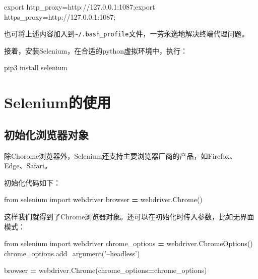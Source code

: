 \documentclass[]{ctexbook}
\newenvironment{Shaded}{\begin{snugshade}}{\end{snugshade}}
\newcommand{\BuiltInTok}[1]{#1}
\newcommand{\ExtensionTok}[1]{#1}
\newcommand{\ImportTok}[1]{#1}
\newcommand{\NormalTok}[1]{#1}
\newcommand{\OperatorTok}[1]{\textcolor[rgb]{0.81,0.36,0.00}{\textbf{#1}}}
\newcommand{\StringTok}[1]{\textcolor[rgb]{0.31,0.60,0.02}{#1}}
\newcommand{\VariableTok}[1]{\textcolor[rgb]{0.00,0.00,0.00}{#1}}
\begin{document}
\begin{Shaded}
\begin{Highlighting}[]
\BuiltInTok{export} \VariableTok{http_proxy=}\NormalTok{http://127.0.0.1:1087;}\BuiltInTok{export} \VariableTok{https_proxy=}\NormalTok{http://127.0.0.1:1087;}
\end{Highlighting}
\end{Shaded}

也可将上述内容加入到\texttt{\textasciitilde{}/.bash\_profile}文件，一劳永逸地解决终端代理问题。

接着，安装Selenium，在合适的python虚拟环境中，执行：

\begin{Shaded}
\begin{Highlighting}[]
\ExtensionTok{pip3}\NormalTok{ install selenium}
\end{Highlighting}
\end{Shaded}

\hypertarget{seleniumux7684ux4f7fux7528}{%
\section{Selenium的使用}\label{seleniumux7684ux4f7fux7528}}

\hypertarget{ux521dux59cbux5316ux6d4fux89c8ux5668ux5bf9ux8c61}{%
\subsection{初始化浏览器对象}\label{ux521dux59cbux5316ux6d4fux89c8ux5668ux5bf9ux8c61}}

除Chorome浏览器外，Selenium还支持主要浏览器厂商的产品，如Firefox、Edge、Safari。

初始化代码如下：

\begin{Shaded}
\begin{Highlighting}[]
\ImportTok{from}\NormalTok{ selenium }\ImportTok{import}\NormalTok{ webdriver}
\NormalTok{browser }\OperatorTok{=}\NormalTok{ webdriver.Chrome()}
\end{Highlighting}
\end{Shaded}

这样我们就得到了Chrome浏览器对象。还可以在初始化时传入参数，比如无界面模式：

\begin{Shaded}
\begin{Highlighting}[]
\ImportTok{from}\NormalTok{ selenium }\ImportTok{import}\NormalTok{ webdriver}
\NormalTok{chrome_options }\OperatorTok{=}\NormalTok{ webdriver.ChromeOptions()}
\NormalTok{chrome_options.add_argument(}\StringTok{'--headless'}\NormalTok{)}

\NormalTok{browser }\OperatorTok{=}\NormalTok{ webdriver.Chrome(chrome_options}\OperatorTok{=}\NormalTok{chrome_options)}
\end{Highlighting}
\end{Shaded}
\end{document}
